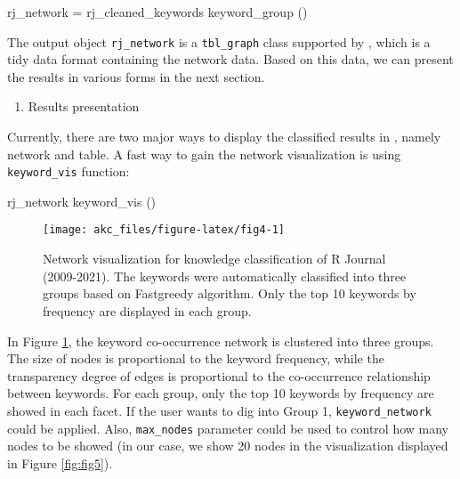 \begin{Schunk}
\begin{Sinput}
rj_network = rj_cleaned_keywords %>%
  keyword_group ()
\end{Sinput}
\end{Schunk}

The output object \texttt{rj\_network} is a \texttt{tbl\_graph} class
supported by , which is a tidy data format containing
the network data. Based on this data, we can present the results in
various forms in the next section.

\begin{enumerate}
\def\labelenumi{(\arabic{enumi})}
\setcounter{enumi}{3}
\tightlist
\item
  Results presentation
\end{enumerate}

Currently, there are two major ways to display the classified results in
, namely network and table. A fast way to gain the network
visualization is using \texttt{keyword\_vis} function:

\begin{Schunk}
\begin{Sinput}
rj_network %>%
  keyword_vis ()
\end{Sinput}
\begin{figure}

{\centering \texttt{[image: akc\_files/figure-latex/fig4-1]}

}

\caption[Network visualization for knowledge classification of R Journal (2009-2021)]{Network visualization for knowledge classification of R Journal (2009-2021). The keywords were automatically classified into three groups based on Fastgreedy algorithm. Only the top 10 keywords by frequency are displayed in each group.}\label{fig:fig4}
\end{figure}
\end{Schunk}

In Figure \ref{fig:fig4}, the keyword co-occurrence network is clustered
into three groups. The size of nodes is proportional to the keyword
frequency, while the transparency degree of edges is proportional to the
co-occurrence relationship between keywords. For each group, only the
top 10 keywords by frequency are showed in each facet. If the user wants
to dig into Group 1, \texttt{keyword\_network} could be applied. Also,
\texttt{max\_nodes} parameter could be used to control how many nodes to
be showed (in our case, we show 20 nodes in the visualization displayed
in Figure \ref{fig:fig5}).

